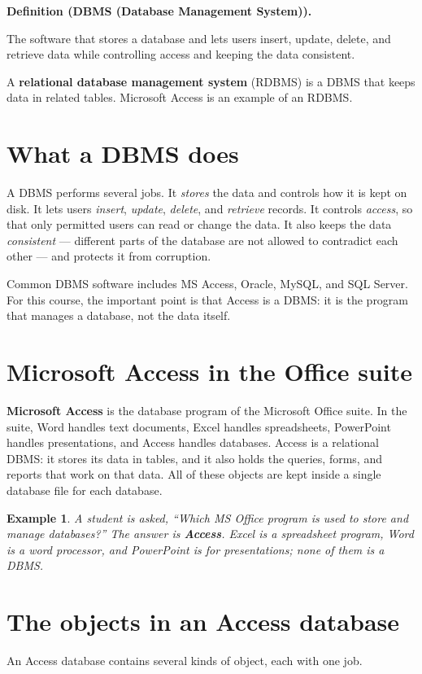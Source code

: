 \documentclass[11pt]{article}
\newtheorem{example}{Example}[section]
\newenvironment{definitionbox}[1]{%
  \par\noindent\textbf{Definition (#1).}\ \itshape
}{\par\vspace{0.3em}}
\begin{document}
\begin{definitionbox}{DBMS (Database Management System)}
The software that stores a database and lets users insert, update, delete,
and retrieve data while controlling access and keeping the data consistent.
\end{definitionbox}

A \textbf{relational database management system} (RDBMS) is a DBMS that keeps
data in related tables. Microsoft Access is an example of an RDBMS.

\section{What a DBMS does}
A DBMS performs several jobs. It \emph{stores} the data and controls how it is
kept on disk. It lets users \emph{insert}, \emph{update}, \emph{delete}, and
\emph{retrieve} records. It controls \emph{access}, so that only permitted
users can read or change the data. It also keeps the data
\emph{consistent} --- different parts of the database are not allowed to
contradict each other --- and protects it from corruption.

Common DBMS software includes MS Access, Oracle, MySQL, and SQL Server. For
this course, the important point is that Access is a DBMS: it is the program
that manages a database, not the data itself.

\section{Microsoft Access in the Office suite}
\textbf{Microsoft Access} is the database program of the Microsoft Office
suite. In the suite, Word handles text documents, Excel handles spreadsheets,
PowerPoint handles presentations, and Access handles databases. Access is a
relational DBMS: it stores its data in tables, and it also holds the queries,
forms, and reports that work on that data. All of these objects are kept
inside a single database file for each database.

\begin{example}
A student is asked, ``Which MS Office program is used to store and manage
databases?'' The answer is \textbf{Access}. Excel is a spreadsheet program,
Word is a word processor, and PowerPoint is for presentations; none of them
is a DBMS.
\end{example}

\section{The objects in an Access database}
An Access database contains several kinds of object, each with one job.
\end{document}
